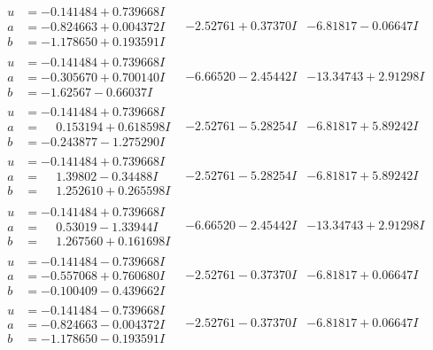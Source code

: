 \documentclass[1p]{elsarticle_modified}
\theoremstyle{definition}
\begin{document}
$$\begin{array}{c|c|c}
\begin{aligned}
u &= -0.141484 + 0.739668 I \\
a &= -0.824663 + 0.004372 I \\
b &= -1.178650 + 0.193591 I\end{aligned}
 & -2.52761 + 0.37370 I & -6.81817 - 0.06647 I \\ \hline\begin{aligned}
u &= -0.141484 + 0.739668 I \\
a &= -0.305670 + 0.700140 I \\
b &= -1.62567 - 0.66037 I\end{aligned}
 & -6.66520 - 2.45442 I & -13.34743 + 2.91298 I \\ \hline\begin{aligned}
u &= -0.141484 + 0.739668 I \\
a &= \phantom{-}0.153194 + 0.618598 I \\
b &= -0.243877 - 1.275290 I\end{aligned}
 & -2.52761 - 5.28254 I & -6.81817 + 5.89242 I \\ \hline\begin{aligned}
u &= -0.141484 + 0.739668 I \\
a &= \phantom{-}1.39802 - 0.34488 I \\
b &= \phantom{-}1.252610 + 0.265598 I\end{aligned}
 & -2.52761 - 5.28254 I & -6.81817 + 5.89242 I \\ \hline\begin{aligned}
u &= -0.141484 + 0.739668 I \\
a &= \phantom{-}0.53019 - 1.33944 I \\
b &= \phantom{-}1.267560 + 0.161698 I\end{aligned}
 & -6.66520 - 2.45442 I & -13.34743 + 2.91298 I \\ \hline\begin{aligned}
u &= -0.141484 - 0.739668 I \\
a &= -0.557068 + 0.760680 I \\
b &= -0.100409 - 0.439662 I\end{aligned}
 & -2.52761 - 0.37370 I & -6.81817 + 0.06647 I \\ \hline\begin{aligned}
u &= -0.141484 - 0.739668 I \\
a &= -0.824663 - 0.004372 I \\
b &= -1.178650 - 0.193591 I\end{aligned}
 & -2.52761 - 0.37370 I & -6.81817 + 0.06647 I \\ \hline\begin{aligned}

\end{aligned}
\end{array}$$
\end{document}
